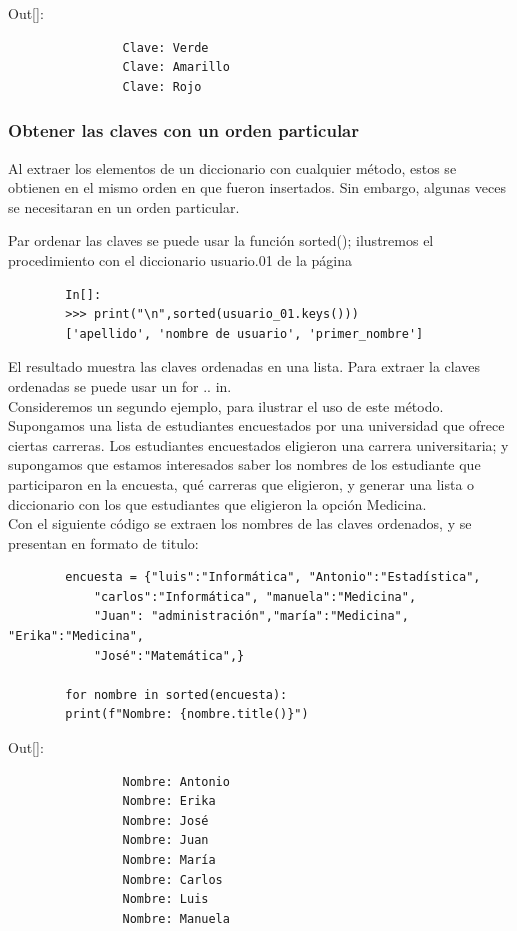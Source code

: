 	{\ttfamily\scriptsize\scriptsize \noindent Out[]: \vspace{-0.3cm}	
		{\color{blue} 	
			\begin{verbatim}
				Clave: Verde
				Clave: Amarillo
				Clave: Rojo
			\end{verbatim}
	}}
	
	
	\subsubsection{Obtener las claves con un orden particular}
	
	Al extraer los elementos de un diccionario con cualquier método, estos se obtienen en el mismo orden en que
	fueron insertados. Sin embargo, algunas veces se necesitaran en un orden particular. 
	
	Par ordenar las claves se puede usar la función  {\ttfamily sorted()}; ilustremos el procedimiento con el diccionario {\ttfamily usuario.01} de  la página \pageref{usuario.01}
	\begin{lstlisting}
		In[]:
		>>> print("\n",sorted(usuario_01.keys()))
		['apellido', 'nombre de usuario', 'primer_nombre']
	\end{lstlisting}
	
	El resultado muestra las claves ordenadas en una lista. Para extraer la claves ordenadas se puede usar un {\ttfamily for .. in}.\\
	
	
	Consideremos un segundo ejemplo, para ilustrar el uso de este método.  Supongamos una lista de estudiantes encuestados por una universidad que ofrece ciertas carreras. Los estudiantes encuestados eligieron una carrera universitaria; y supongamos que estamos interesados saber los nombres de los estudiante que participaron en la encuesta,  qué carreras que eligieron, y generar una lista o diccionario con los que estudiantes que eligieron la opción Medicina.\\
	
	Con el siguiente código se extraen los nombres de las claves ordenados, y se presentan en formato de titulo:
	
	\hspace{-2.5cm}{\ttfamily \scriptsize encuesta.py}\label{encuesta} \vspace{-0.5cm}
	\begin{lstlisting}
		encuesta = {"luis":"Informática", "Antonio":"Estadística",
			"carlos":"Informática", "manuela":"Medicina",
			"Juan": "administración","maría":"Medicina", "Erika":"Medicina", 
			"José":"Matemática",}
		
		for nombre in sorted(encuesta):
		print(f"Nombre: {nombre.title()}")
	\end{lstlisting}	
	{\ttfamily\scriptsize\scriptsize 
		\hspace{-0.0cm}Out[]: \vspace{-0.3cm}	
		{\color{blue} 	
			\begin{verbatim}
				Nombre: Antonio
				Nombre: Erika
				Nombre: José
				Nombre: Juan
				Nombre: María
				Nombre: Carlos
				Nombre: Luis
				Nombre: Manuela
			\end{verbatim}
	}}
	
